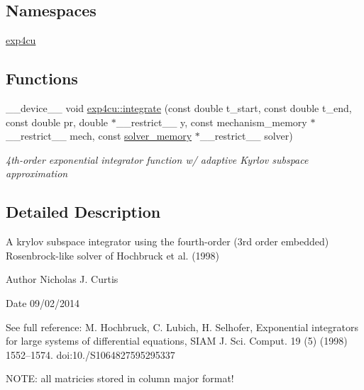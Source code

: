 \subsection*{Namespaces}
\begin{DoxyCompactItemize}
\item 
 \hyperlink{namespaceexp4cu}{exp4cu}
\end{DoxyCompactItemize}
\subsection*{Functions}
\begin{DoxyCompactItemize}
\item 
\+\_\+\+\_\+device\+\_\+\+\_\+ void \hyperlink{namespaceexp4cu_aac3abe15ef50061cdfe24ed7d9d64b7a}{exp4cu\+::integrate} (const double t\+\_\+start, const double t\+\_\+end, const double pr, double $\ast$\+\_\+\+\_\+restrict\+\_\+\+\_\+ y, const mechanism\+\_\+memory $\ast$\+\_\+\+\_\+restrict\+\_\+\+\_\+ mech, const \hyperlink{structsolver__memory}{solver\+\_\+memory} $\ast$\+\_\+\+\_\+restrict\+\_\+\+\_\+ solver)
\begin{DoxyCompactList}\small\item\em 4th-\/order exponential integrator function w/ adaptive Kyrlov subspace approximation \end{DoxyCompactList}\end{DoxyCompactItemize}


\subsection{Detailed Description}
A krylov subspace integrator using the fourth-\/order (3rd order embedded) Rosenbrock-\/like solver of Hochbruck et al. (1998) 

\begin{DoxyAuthor}{Author}
Nicholas J. Curtis 
\end{DoxyAuthor}
\begin{DoxyDate}{Date}
09/02/2014
\end{DoxyDate}
See full reference\+: M. Hochbruck, C. Lubich, H. Selhofer, Exponential integrators for large systems of differential equations, S\+I\+AM J. Sci. Comput. 19 (5) (1998) 1552–1574. doi\+:10./\+S1064827595295337

N\+O\+TE\+: all matricies stored in column major format! 